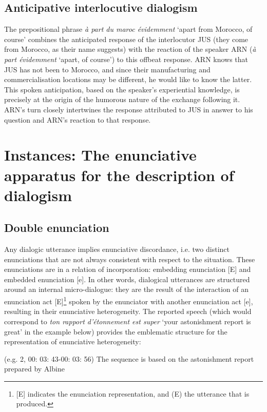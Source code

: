\documentclass[output=paper]{langscibook}
\begin{document}
\subsection{Anticipative interlocutive dialogism}

The prepositional phrase \textit{à part du maroc évidemment} `apart from Morocco, of course' combines the anticipated response of the interlocutor JUS (they come from Morocco, as their name suggests) with the reaction of the speaker ARN (\textit{à part évidemment} `apart, of course') to this offbeat response. ARN knows that JUS has not been to Morocco, and since their manufacturing and commercialisation locations may be different, he would like to know the latter. This spoken anticipation, based on the speaker's experiential knowledge, is precisely at the origin of the humorous nature of the exchange following it. ARN's turn closely intertwines the response attributed to JUS in answer to his question and ARN’s reaction to that response.

\section{Instances: The enunciative apparatus for the description of dialogism}
\subsection{Double enunciation}

Any dialogic utterance implies enunciative discordance, i.e. two distinct enunciations that are not always consistent with respect to the situation. These enunciations are in a relation of incorporation: embedding enunciation [E] and embedded enunciation [e]. In other words, dialogical utterances are structured around an internal micro-dialogue: they are the result of the interaction of an enunciation act [E]\footnote{[E] indicates the enunciation representation, and (E) the utterance that is produced.} spoken by the enunciator with another enunciation act [e], resulting in their enunciative heterogeneity. The reported speech (which would correspond to \textit{ton rapport d’étonnement est super} ‘your astonishment report is great’ in the example below) provides the emblematic structure for the representation of enunciative heterogeneity:

\ea 
\label{ex:8:2}

{(e.g. 2, 00: 03: 43-00: 03: 56) The sequence is based on the astonishment report prepared by Albine}
\end{document}
